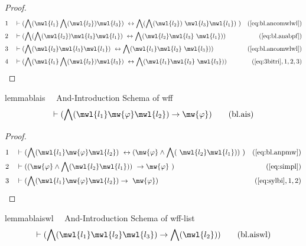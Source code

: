 \begin{proof}
\begin{align}
  1 &&  & \vdash ( \bigwedge( \mwl{l_1} \bigwedge( \mwl{l_2} ) \mwl{l_3} )
     ~\leftrightarrow \bigwedge( \bigwedge( \mwl{l_2} )
     ~\mwl{l_3} \mwl{l_1} )
     ~)&(\mbox{\ref{eq:bl.ancomwlwl}})\notag
  \\ 2 &&  & \vdash ( \bigwedge( \bigwedge( \mwl{l_2} ) \mwl{l_3} \mwl{l_1} )
     ~\leftrightarrow \bigwedge( \mwl{l_2} \mwl{l_3}
     ~\mwl{l_1} ) )&(\mbox{\ref{eq:bl.anabpf}})\notag
  \\ 3 &&  & \vdash ( \bigwedge( \mwl{l_2} \mwl{l_3} \mwl{l_1} )
     ~\leftrightarrow \bigwedge( \mwl{l_1} \mwl{l_2}
     ~\mwl{l_3} ) )&(\mbox{\ref{eq:bl.ancomwlwl}})\notag
  \\ 4 &&  & \vdash ( \bigwedge( \mwl{l_1} \bigwedge( \mwl{l_2} ) \mwl{l_3} )
     ~\leftrightarrow \bigwedge( \mwl{l_1} \mwl{l_2}
     ~\mwl{l_3} ) )&(\mbox{\ref{eq:3bitri}},1,2,3)\notag
\end{align}
\end{proof}

\begin{restatable}{lemma}{blais}~~ And-Introduction Schema of wff
\begin{align}
\vdash ( \bigwedge( \mwl{l_1} \mw{\varphi} \mwl{l_2} ) \rightarrow \mw{\varphi}
    )\label{eq:bl.ais}\tag{bl.ais}
\end{align}
\end{restatable}

\begin{proof}
\begin{align}
  1 &&  & \vdash ( \bigwedge( \mwl{l_1} \mw{\varphi} \mwl{l_2} )
     ~\leftrightarrow ( \mw{\varphi} \wedge \bigwedge(
     ~\mwl{l_2} \mwl{l_1} ) )
     ~)&(\mbox{\ref{eq:bl.anpmw}})\notag
  \\ 2 &&  & \vdash ( ( \mw{\varphi} \wedge \bigwedge( \mwl{l_2} \mwl{l_1} ) )
     ~\rightarrow \mw{\varphi}
     ~)&(\mbox{\ref{eq:simpl}})\notag
  \\ 3 &&  & \vdash ( \bigwedge( \mwl{l_1} \mw{\varphi} \mwl{l_2} ) \rightarrow
     ~\mw{\varphi} )&(\mbox{\ref{eq:sylbi}},1,2)\notag
\end{align}
\end{proof}

\begin{restatable}{lemma}{blaiswl}~~ And-Introduction Schema of wff-list
\begin{align}
\vdash ( \bigwedge( \mwl{l_1} \mwl{l_2} \mwl{l_3} ) \rightarrow \bigwedge(
    \mwl{l_2} ) )\label{eq:bl.aiswl}\tag{bl.aiswl}
\end{align}
\end{restatable}

